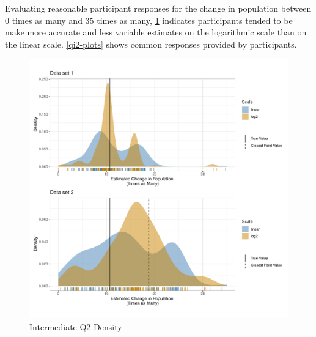 \documentclass[print]{nuthesis}
\begin{document}
Evaluating reasonable participant responses for the change in population between 0 times as many and 35 times as many, \cref{fig:qi2-density} indicates participants tended to be make more accurate and less variable estimates on the logarithmic scale than on the linear scale.
\cref{qi2-plots} shows common responses provided by participants.

\begin{figure}[tbp]

{\centering \includegraphics[width=1\linewidth,]{thesis_files/figure-latex/qi2-density-1} 

}

\caption{Intermediate Q2 Density}\label{fig:qi2-density}
\end{figure}
\end{document}
